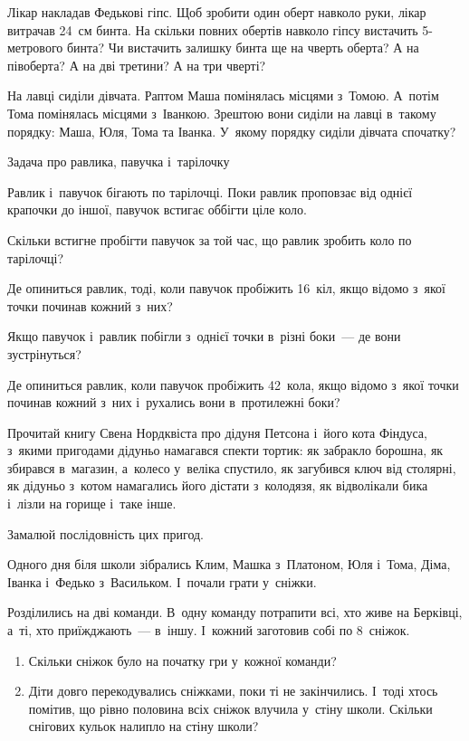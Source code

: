\problem
Лікар накладав Федькові гіпс.
Щоб зробити один оберт навколо руки, лікар витрачав 24~см бинта.
На скільки повних обертів навколо гіпсу вистачить 5-метрового бинта?
Чи вистачить залишку бинта ще на чверть оберта?
А на півоберта?
А на дві третини?
А на три чверті?


\problem
На лавці сиділи дівчата. Раптом Маша помінялась місцями з~Томою.
А~потім Тома помінялась місцями з~Іванкою.
Зрештою вони сиділи на лавці в~такому порядку: Маша, Юля, Тома та Іванка.
У~якому порядку сиділи дівчата спочатку?


\problem
Задача про равлика, павучка і~тарілочку

Равлик і~павучок бігають по тарілочці.
Поки равлик проповзає від однієї крапочки до іншої,
павучок встигає оббігти ціле коло. 

Скільки встигне пробігти павучок за той час,
що равлик зробить коло по тарілочці? 

Де опиниться равлик, тоді, коли павучок пробіжить 16~кіл,
якщо відомо з~якої точки починав кожний з~них? 

Якщо павучок і~равлик побігли з~однієї точки в~різні боки~--- 
де вони зустрінуться? 

Де опиниться равлик, коли павучок пробіжить 42~кола, якщо відомо
з~якої точки починав кожний з~них і~рухались вони в~протилежні боки?


\problem
Прочитай книгу Свена Нордквіста про дідуня Петсона і~його кота Фіндуса,
з~якими пригодами дідуньо намагався спекти тортик: як забракло борошна,
як збирався в~магазин, а~колесо у~веліка спустило, як загубився ключ
від столярні, як дідуньо з~котом намагались його дістати з~колодязя,
як відволікали бика і~лізли на горище і~таке інше.

Замалюй послідовність цих пригод.


\problem
Одного дня біля школи зібрались Клим, Машка з~Платоном, Юля і~Тома,
Діма, Іванка і~Федько з~Васильком. І~почали грати у~сніжки.

Розділились на дві команди. В~одну команду потрапити всі,
хто живе на Берківці, а~ті, хто приїжджають~--- в~іншу.
І~кожний заготовив собі по 8~сніжок.

\begin{enumerate}
    \item Скільки сніжок було на початку гри у~кожної команди?
    \item Діти довго перекодувались сніжками, поки ті не закінчились.
    І~тоді хтось помітив, що рівно половина всіх сніжок влучила у~стіну школи.
    Скільки снігових кульок налипло на стіну школи?
\end{enumerate}


